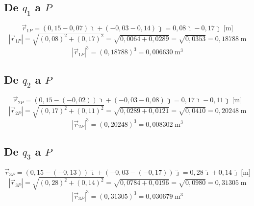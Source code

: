 \documentclass[12pt,letterpaper]{article}
\begin{document}
\subsection*{De $q_1$ a $P$}
\begin{equation*}
\vec{r}_{1P} = (0{,}15 - 0{,}07)\,\hat{\imath} + (-0{,}03 - 0{,}14)\,\hat{\jmath}
= 0{,}08\,\hat{\imath} - 0{,}17\,\hat{\jmath} \;\text{[m]}
\end{equation*}
\begin{equation*}
|\vec{r}_{1P}| = \sqrt{(0{,}08)^2 + (0{,}17)^2}
= \sqrt{0{,}0064 + 0{,}0289}
= \sqrt{0{,}0353}
= 0{,}18788\;\text{m}
\end{equation*}
\begin{equation*}
|\vec{r}_{1P}|^3 = (0{,}18788)^3 = 0{,}006630\;\text{m}^3
\end{equation*}

\subsection*{De $q_2$ a $P$}
\begin{equation*}
\vec{r}_{2P} = (0{,}15 - (-0{,}02))\,\hat{\imath} + (-0{,}03 - 0{,}08)\,\hat{\jmath}
= 0{,}17\,\hat{\imath} - 0{,}11\,\hat{\jmath} \;\text{[m]}
\end{equation*}
\begin{equation*}
|\vec{r}_{2P}| = \sqrt{(0{,}17)^2 + (0{,}11)^2}
= \sqrt{0{,}0289 + 0{,}0121}
= \sqrt{0{,}0410}
= 0{,}20248\;\text{m}
\end{equation*}
\begin{equation*}
|\vec{r}_{2P}|^3 = (0{,}20248)^3 = 0{,}008302\;\text{m}^3
\end{equation*}

\subsection*{De $q_3$ a $P$}
\begin{equation*}
\vec{r}_{3P} = (0{,}15 - (-0{,}13))\,\hat{\imath} + (-0{,}03 - (-0{,}17))\,\hat{\jmath}
= 0{,}28\,\hat{\imath} + 0{,}14\,\hat{\jmath} \;\text{[m]}
\end{equation*}
\begin{equation*}
|\vec{r}_{3P}| = \sqrt{(0{,}28)^2 + (0{,}14)^2}
= \sqrt{0{,}0784 + 0{,}0196}
= \sqrt{0{,}0980}
= 0{,}31305\;\text{m}
\end{equation*}
\begin{equation*}
|\vec{r}_{3P}|^3 = (0{,}31305)^3 = 0{,}030679\;\text{m}^3
\end{equation*}
\end{document}
